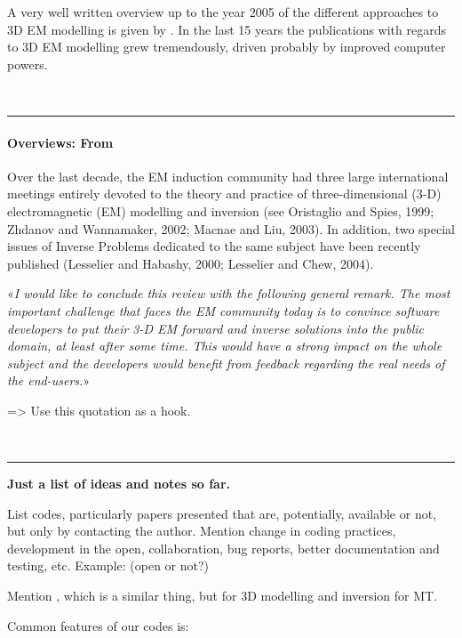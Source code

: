 \documentclass[
    paper,
  ]{geophysics}
\begin{document}
A very well written overview up to the year 2005 of the different approaches to
3D EM modelling is given by \cite{SG.05.Avdeev}. In the last 15 years the
publications with regards to 3D EM  modelling grew tremendously, driven
probably by improved computer powers.


~\\ \hrule

\paragraph{Overviews: From \cite{SG.05.Avdeev}}

Over the last decade, the EM induction community had three large international
meetings entirely devoted to the theory and practice of three-dimensional (3-D)
electromagnetic (EM) modelling and inversion (see Oristaglio and Spies, 1999;
Zhdanov and Wannamaker, 2002; Macnae and Liu, 2003). In addition, two special
issues of Inverse Problems dedicated to the same subject have been recently
published (Lesselier and Habashy, 2000; Lesselier and Chew, 2004).

«\emph{I would like to conclude this review with the following general remark.
  The most important challenge that faces the EM community today is to convince
  software developers to put their 3-D EM forward and inverse solutions into
  the public domain, at least after some time. This would have a strong impact
  on the whole subject and the developers would benefit from feedback regarding
the real needs of the end-users.}»

=> Use this quotation as a hook.


~\\ \hrule

\textbf{Just a list of ideas and notes so far.}

List codes, particularly papers presented that are, potentially, available or
not, but only by contacting the author. Mention change in coding practices,
development in the open, collaboration, bug reports, better documentation and
testing, etc. Example: \cite{CAG.17.Cai} (open or not?)

Mention \cite{GJI.13.Miensopust}, which is a similar thing, but for 3D
modelling and inversion for MT.

Common features of our codes is:
\end{document}
